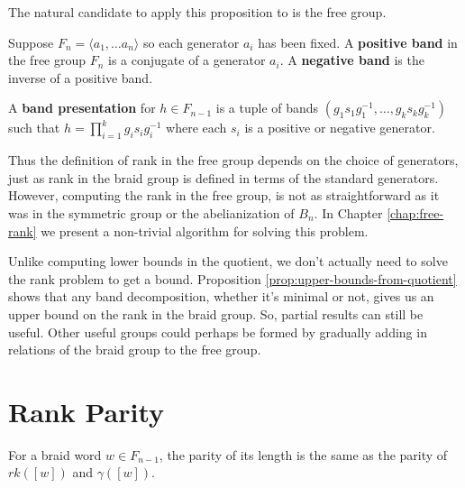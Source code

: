 \documentclass[12pt]{thesis}
\begin{document}
The natural candidate to apply this proposition to is the free group.
\begin{definition}
    Suppose $F_{n} = \langle a_{1}, \ldots a_{n} \rangle$
    so each generator $a_{i}$ has been fixed.
    A \textbf{positive band} in the free group $F_{n}$ is a conjugate
    of a generator $a_{i}$.
    A \textbf{negative band} is the inverse of a positive band.
\end{definition}
\begin{definition}
    A \textbf{band presentation} for $h \in F_{n-1}$ is a 
    tuple of bands $(g_{1}s_{1}g_{1}^{-1}, \ldots, g_{k}s_{k}g_{k}^{-1})$
    such that $h = \prod_{i=1}^{k} g_{i}s_{i}g_{i}^{-1}$
    where each $s_{i}$ is a positive or negative generator.
\end{definition}
Thus the definition of rank in the free group depends on the choice
of generators, just as rank in the braid group is defined in terms 
of the standard generators.
However, computing the rank in the free group, is not as straightforward
as it was in the symmetric group or the abelianization of $B_{n}$.
In Chapter \ref{chap:free-rank} we
present a non-trivial algorithm for solving this problem.

Unlike computing lower bounds in the quotient,
we don't actually need to solve the rank problem to get a bound.
Proposition \ref{prop:upper-bounds-from-quotient} shows that any band decomposition, whether it's minimal or not, gives
us an upper bound on the rank in the braid group.
So, partial results can still be useful.
Other useful groups could perhaps be
formed by gradually adding in relations of the braid group 
to the free group.

\section{Rank Parity}

\begin{corollary}
    \label{cor:rank-parity}
    For a braid word $w \in F_{n-1}$,
    the parity of its length
    is the same as the parity of $rk([w])$ and $\gamma([w])$.
\end{corollary}
\end{document}
